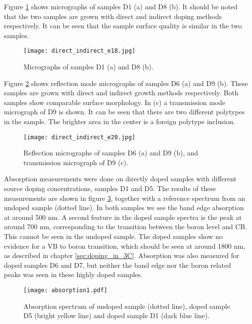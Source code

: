 Figure \ref{fig:B_doped_micrographs2} shows micrographs of samples D1 (a) and D8 (b). It should be noted that the two samples are grown with direct and indirect doping methods respectively. It can be seen that the sample surface quality is similar in the two samples. 

\begin{figure}[H]
\begin{center}
\texttt{[image: direct\_indirect\_e18.jpg]}
\caption{Micrographs of samples D1 (a) and D8 (b). 
\label{fig:B_doped_micrographs2}}
\end{center}
\end{figure}


Figure \ref{fig:BGe20_micrograph} shows reflection mode micrographs of samples D6 (a) and D9 (b). These samples are grown with direct and indirect growth methods respectively. Both samples show comparable surface morphology. In (c) a transmission mode micrograph of D9 is shown. It can be seen that there are two different polytypes in the sample. The brighter area in the center is a foreign polytype inclusion. 

\begin{figure}[h]
\begin{center}
\texttt{[image: direct\_indirect\_e20.jpg]}
\caption{Reflection micrographs of samples D6 (a) and D9 (b), and transmission micrograph of D9 (c). 
\label{fig:BGe20_micrograph}}
\end{center}
\end{figure}

Absorption measurements were done on directly doped samples with different source doping concentrations, samples D1 and D5. The results of these measurements are shown in figure \ref{fig:abs1}, together with a reference spectrum from an undoped sample (dotted line). In both samples we see the band edge absorption at around 500 nm. A second feature in the doped sample spectra is the peak at around 700 nm, corresponding to the transition between the boron level and CB. This cannot be seen in the undoped sample. The doped samples show no evidence for a VB to boron transition, which should be seen at around 1800 nm, as described in chapter \ref{sec:doping_in_3C}. Absorption was also measured for doped samples D6 and D7, but neither the band edge nor the boron related peaks was seen in these highly doped samples. 

\begin{figure}[h]
\begin{center}
\texttt{[image: absorption1.pdf]}
\caption{Absorption spectrum of undoped sample (dotted line), doped sample D5 (bright yellow line) and doped sample D1 (dark blue line). 
\label{fig:abs1}}
\end{center}
\end{figure}

